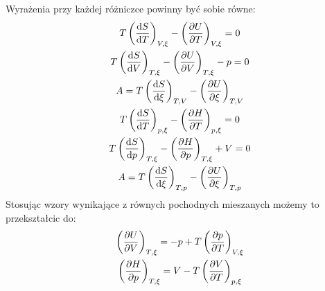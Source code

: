 \documentclass[10pt, a4paper, twoside, onecolumn]{article}
\numberwithin{equation}{section}
\begin{document}
	Wyrażenia przy każdej różniczce powinny być sobie równe:
	\begin{gather}
		T\left(\dv{S}{T}\right)_{V, \xi}-\left(\pdv{U}{T}\right)_{V, \xi}=0 \\
		T\left(\dv{S}{V}\right)_{T, \xi}-\left(\pdv{U}{V}\right)_{T, \xi}-p=0 \\
		A=T\left(\dv{S}{\xi}\right)_{T, V}-\left(\pdv{U}{\xi}\right)_{T, V} \\
		T\left(\dv{S}{T}\right)_{p, \xi}-\left(\pdv{H}{T}\right)_{p, \xi}=0 \\
		T\left(\dv{S}{p}\right)_{T, \xi}-\left(\pdv{H}{p}\right)_{T, \xi}+V=0 \\
		A=T\left(\dv{S}{\xi}\right)_{T, p}-\left(\pdv{U}{\xi}\right)_{T, p}
	\end{gather}
	Stosując wzory wynikające z równych pochodnych mieszanych możemy to przekształcic do: 
	\begin{gather}
		\left(\pdv{U}{V}\right)_{T, \xi}=-p+T\left(\pdv{p}{T}\right)_{V, \xi} \\
		\left(\pdv{H}{p}\right)_{T, \xi}=V-T\left(\pdv{V}{T}\right)_{p, \xi}
	\end{gather}
	\pagebreak
\end{document}

